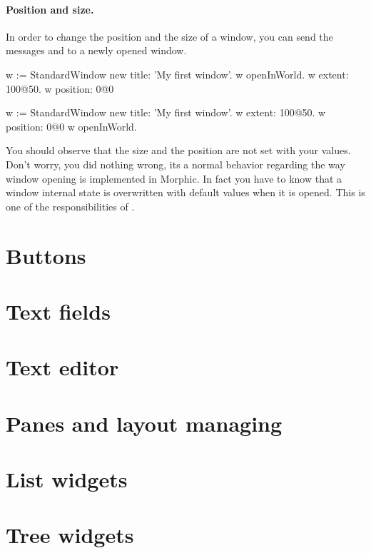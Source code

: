 \documentclass[a4paper,10pt,twoside]{book}
\begin{document}
\paragraph*{Position and size.}
In order to change the position and the size of a window, you can send the messages  and  to a newly opened window. 
\begin{code}{}
w := StandardWindow new title: 'My first window'.
w openInWorld.
w extent: 100@50.
w position: 0@0
\end{code}
\begin{code}{}
w := StandardWindow new title: 'My first window'.
w extent: 100@50.
w position: 0@0
w openInWorld.
\end{code}
You should observe that the size and the position are not set with your values. Don't worry, you did nothing wrong, its a normal behavior regarding the way window opening is implemented in Morphic. In fact you have to know that a window internal state is overwritten with default values when it is opened. This is one of the responsibilities of . 


\section{Buttons}

\section{Text fields}

\section{Text editor}

\section{Panes and layout managing}

\section{List widgets}

\section{Tree widgets}
\end{document}
